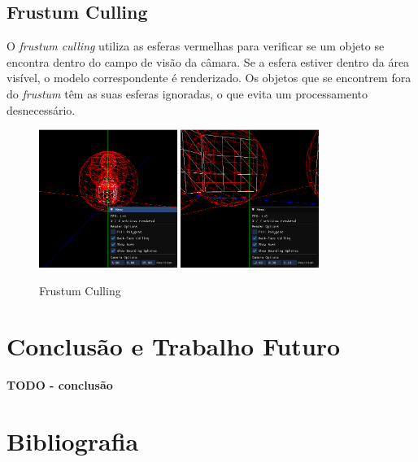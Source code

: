 \documentclass[12pt, a4paper]{article}
\begin{document}
\subsection{Frustum Culling}

O \textit{frustum culling} utiliza as esferas vermelhas para verificar se um objeto
se encontra dentro do campo de visão da câmara. Se a esfera estiver dentro da área visível, o
modelo correspondente é renderizado. Os objetos que se encontrem fora do \textit{frustum} têm as
suas esferas ignoradas, o que evita um processamento desnecessário.

\begin{figure}[H]
    \begin{adjustwidth}{-2cm}{-2cm}
        \centering
        \includegraphics[width=0.4\textwidth]{res/phase2/results/FrustumCulling.png}
        \includegraphics[width=0.4\textwidth]{res/phase2/results/FrustumCullingpt2.png}
        \caption{Frustum Culling}
    \end{adjustwidth}
\end{figure}

\section{Conclusão e Trabalho Futuro}

\textbf{\color{red} TODO - conclusão}

\begingroup
\section{Bibliografia}
\renewcommand{\section}[2]{}
\end{document}
